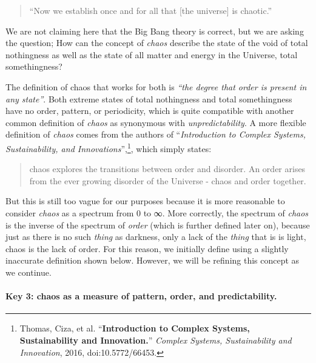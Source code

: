 \documentclass[
]{article}
\begin{document}
\begin{quote}
``Now we establish once and for all that {[}the universe{]} is
chaotic.''
\end{quote}

We are not claiming here that the Big Bang theory is correct, but we are
asking the question; How can the concept of \emph{chaos} describe the
state of the void of total nothingness as well as the state of all
matter and energy in the Universe, total somethingness?

The definition of chaos that works for both is \emph{``the degree that
order is present in any state''}. Both extreme states of total
nothingness and total somethingness have no order, pattern, or
periodicity, which is quite compatible with another common definition of
\emph{chaos} as synonymous with \emph{unpredictability}. A more flexible
definition of \emph{chaos} comes from the authors of
``\emph{Introduction to Complex Systems, Sustainability, and
Innovations}'',\footnote{Thomas, Ciza, et al. ``\textbf{Introduction to
  Complex Systems, Sustainability and Innovation.}'' \emph{Complex
  Systems, Sustainability and Innovation}, 2016, doi:10.5772/66453.},
which simply states:

\begin{quote}
chaos explores the transitions between order and disorder. An order
arises from the ever growing disorder of the Universe - chaos and order
together.
\end{quote}

But this is still too vague for our purposes because it is more
reasonable to consider \emph{chaos} as a spectrum from 0 to ∞. More
correctly, the spectrum of \emph{chaos} is the inverse of the spectrum
of \emph{order} (which is further defined later on), because just as
there is no such \emph{thing} as darkness, only a lack of the
\emph{thing} that is is light, chaos is the lack of order. For this
reason, we initially define using a slightly inaccurate definition shown
below. However, we will be refining this concept as we continue.

\paragraph{\texorpdfstring{\textbf{Key 3:} chaos as a measure of
pattern, order, and
predictability.}{Key 3: chaos as a measure of pattern, order, and predictability.}}\label{key-3-chaos-as-a-measure-of-pattern-order-and-predictability}
\end{document}
